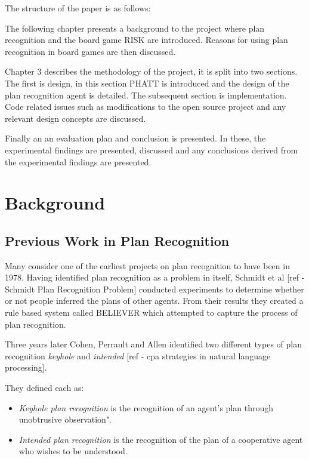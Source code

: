 \documentclass[parskip]{cs4rep}
\begin{document}
The structure of the paper is as follows:

The following chapter presents a background to the project where plan recognition and the board game RISK are introduced. Reasons for using plan recognition in board games are then discussed.

Chapter 3 describes the methodology of the project, it is split into two sections. The first is design, in this section PHATT is introduced and the design of the plan recognition agent is detailed. The subsequent section is implementation. Code related issues such as modifications to the open source project and any relevant design concepts are discussed. 

Finally an an evaluation plan and conclusion is presented. In these, the experimental findings are presented, discussed and any conclusions derived from the experimental findings are presented.

\chapter{Background}

\section{Previous Work in Plan Recognition}

Many consider one of the earliest projects on plan recognition to have been in 1978. Having identified plan recognition as a problem in itself, Schmidt et al [ref - Schmidt Plan Recognition Problem] conducted experiments to determine whether or not people inferred the plans of other agents. From their results they created a rule based system called BELIEVER which attempted to capture the process of plan recognition. 

Three years later Cohen, Perrault and Allen identified two different types of plan recognition \textit{keyhole} and \textit{intended} [ref - cpa strategies in natural language processing]. 

They defined each as:

\begin{itemize}
\item
\textit{Keyhole plan recognition} is the recognition of an agent's plan through unobtrusive observation".
\item
\textit{Intended plan recognition} is the recognition of the plan of a cooperative agent who wishes to be understood.
\newline
\end{itemize}
\end{document}
